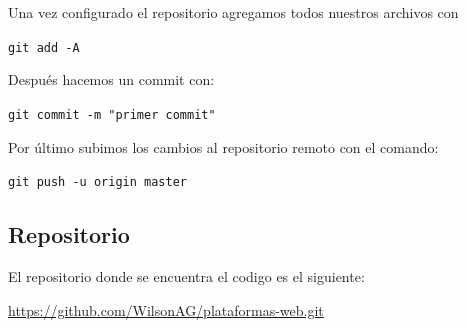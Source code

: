 \documentclass[12pt]{article}
\begin{document}
Una vez configurado el repositorio agregamos todos nuestros archivos con

\lstinline{git add -A}

Después hacemos un commit con:

\lstinline{git commit -m "primer commit"}

Por último subimos los cambios al repositorio remoto con el comando:

\lstinline{git push -u origin master}

\subsection{Repositorio}

El repositorio donde se encuentra el codigo es el siguiente:

\url{https://github.com/WilsonAG/plataformas-web.git}
\end{document}
